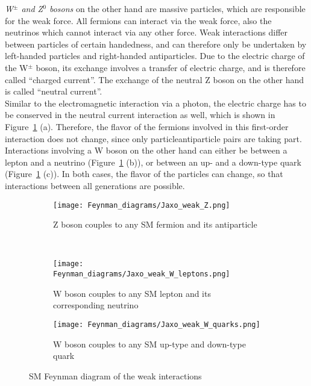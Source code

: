 \begin{minipage}{0.55\textwidth}
\textit{W$^\pm$ and Z$^0$ bosons} on the other hand are massive particles, which are responsible for the weak force.
All fermions can interact via the weak force, also the neutrinos which cannot interact via any other force.
Weak interactions differ between particles of certain handedness, and can therefore only be undertaken by left-handed particles and right-handed antiparticles.
Due to the electric charge of the W$^\pm$ boson, its exchange involves a transfer of electric charge, and is therefore called ``charged current''.
The exchange of the neutral Z boson on the other hand is called ``neutral current''.\\
Similar to the electromagnetic interaction via a photon, the electric charge has to be conserved in the neutral current interaction as well, which is shown in Figure~\ref{fig:Feynman:weak} (a).
Therefore, the flavor of the fermions involved in this first-order interaction does not change, since only particle\textendash antiparticle pairs are taking part.
Interactions involving a W boson on the other hand can either be between a lepton and a neutrino (Figure~\ref{fig:Feynman:weak} (b)), or between an up- and a down-type quark (Figure~\ref{fig:Feynman:weak} (c)). 
In both cases, the flavor of the particles can change, so that interactions between all generations are possible.
\end{minipage} \hfill
\begin{minipage}{0.4\textwidth}
\centering
\begin{figure}[H]
\centering
\begin{subfigure}[b]{\textwidth}\centering
\texttt{[image: Feynman\_diagrams/Jaxo\_weak\_Z.png]}
\caption{Z boson couples to any SM fermion and its antiparticle}
\end{subfigure}\\
\begin{subfigure}[t]{0.48\textwidth}\centering
\texttt{[image: Feynman\_diagrams/Jaxo\_weak\_W\_leptons.png]}
\caption{W boson couples to any SM lepton and its corresponding neutrino}
\end{subfigure}\hfill
\begin{subfigure}[t]{0.48\textwidth}\centering
\texttt{[image: Feynman\_diagrams/Jaxo\_weak\_W\_quarks.png]}
\caption{W boson couples to any SM up-type and down-type quark}
\end{subfigure}
\caption{SM Feynman diagram of the weak interactions}
\label{fig:Feynman:weak} 
\end{figure}
\end{minipage}

